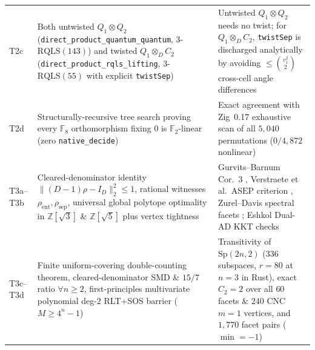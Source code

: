\documentclass[11pt,reqno]{amsart}
\theoremstyle{definition}
\newcommand{\ZZ}{\mathbb{Z}}
\newcommand{\FF}{\mathbb{F}}
\newcommand{\RQLS}{\mathrm{RQLS}}
\newcommand{\ASEP}{\mathrm{ASEP}}
\newcommand{\Sp}{\mathrm{Sp}}
\newcommand{\lid}[1]{{\footnotesize\nolinkurl{#1}}}
\begin{document}
\begin{table}[htbp]
\begin{tabularx}{\textwidth}{@{}l >{\raggedright\arraybackslash}X >{\raggedright\arraybackslash}X@{}}
T2c & Both untwisted $Q_1 \otimes Q_2$ (\lid{direct_product_quantum_quantum}, $3$-$\RQLS(143)$) and twisted $Q_1 \otimes_D C_2$ (\lid{direct_product_rqls_lifting}, $3$-$\RQLS(55)$ with explicit \lid{twistSep}) & Untwisted $Q_1 \otimes Q_2$ needs no twist; for $Q_1 \otimes_D C_2$, \lid{twistSep} is discharged analytically by avoiding $\le \binom{v_1^2}{2}$ cross-cell angle differences \\
T2d & Structurally-recursive tree search proving every $\FF_8$ orthomorphism fixing $0$ is $\FF_2$-linear (zero \lid{native_decide}) & Exact agreement with Zig~0.17 exhaustive scan of all $5{,}040$ permutations ($0/4{,}872$ nonlinear) \\
T3a--T3b & Cleared-denominator identity $\|(D-1)\rho - I_D\|_2^2 \le 1$, rational witnesses $\rho_{\mathrm{ent}}, \rho_{\mathrm{sep}}$, universal global polytope optimality in $\ZZ[\sqrt{3}]$ \& $\ZZ[\sqrt{5}]$ plus vertex tightness & Gurvits--Barnum Cor.~3 \cite{gurvits2002largest}, Verstraete et al.\ $\ASEP$ criterion \cite{verstraete2001maximally}, Zurel--Davis spectral facets \cite{zurel2026astab}; Eshkol Dual-AD KKT checks \\
T3c--T3d & Finite uniform-covering double-counting theorem, cleared-denominator SMD \& $15/7$ ratio $\forall n \ge 2$, first-principles multivariate polynomial deg-$2$ RLT+SOS barrier ($M \ge 4^n-1$) & Transitivity of $\Sp(2n,2)$ ($336$ subspaces, $r=80$ at $n=3$ in Rust), exact $C_2 = 2$ over all $60$ facets \& $240$ CNC $m=1$ vertices, and $1{,}770$ facet pairs ($\min = -1$) \\
\bottomrule
\end{tabularx}
\end{table}
\end{document}
